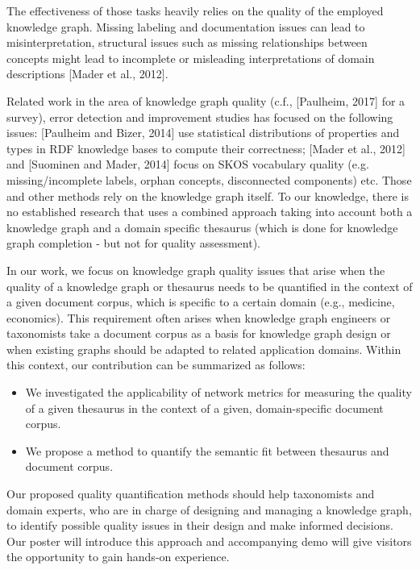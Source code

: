 \documentclass[runningheads,a4paper]{llncs}
\begin{document}
The effectiveness of those tasks heavily relies on the quality of the employed knowledge graph. Missing labeling and documentation issues can lead to misinterpretation, structural issues such as missing relationships between concepts might lead to incomplete or misleading interpretations of domain descriptions [Mader et al., 2012].

Related work in the area of knowledge graph quality (c.f., [Paulheim, 2017] for a survey), error detection and improvement studies has focused on the following issues: [Paulheim and Bizer, 2014] use statistical distributions of properties and types in RDF knowledge bases to compute their correctness; [Mader et al., 2012] and [Suominen and Mader, 2014] focus on SKOS vocabulary quality (e.g. missing/incomplete labels, orphan concepts, disconnected components) etc. Those and other methods rely on the knowledge graph itself. To our knowledge, there is no established research that uses a combined approach taking into account both a knowledge graph and a domain specific thesaurus (which is done for knowledge graph completion - but not for quality assessment).

In our work, we focus on knowledge graph quality issues that arise when the quality of a knowledge graph or thesaurus needs to be quantified in the context of a given document corpus, which is specific to a certain domain (e.g., medicine, economics). This requirement often arises when knowledge graph engineers or taxonomists take a document corpus as a basis for knowledge graph design or when existing graphs should be adapted to related application domains. Within this context, our contribution can be summarized as follows:
\begin{itemize}
\item We investigated the applicability of network metrics for measuring the quality of a given thesaurus in the context of a given, domain-specific document corpus.
\item We propose a method to quantify the semantic fit between thesaurus and document corpus.
\end{itemize}

Our proposed quality quantification methods should help taxonomists and domain experts, who are in charge of designing and managing a knowledge graph, to identify possible quality issues in their design and make informed decisions. Our poster will introduce this approach and accompanying demo will give visitors the opportunity to gain hands-on experience. 
\end{document}

